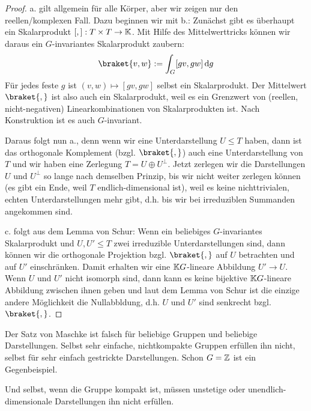 \begin{proof}
a. gilt allgemein für alle Körper, aber wir zeigen nur den reellen/komplexen Fall. Dazu beginnen wir mit b.: Zunächst gibt es überhaupt ein Skalarprodukt $[,]: T\times T\to\mathbb{K}$. Mit Hilfe des Mittelwerttricks können wir daraus ein $G$-invariantes Skalarprodukt zaubern:
\[\braket{v,w} := \int_G [gv,gw] \dd g\]
Für jedes feste $g$ ist $(v,w) \mapsto [gv,gw]$ selbst ein Skalarprodukt. Der Mittelwert $\braket{,}$ ist also auch ein Skalarprodukt, weil es ein Grenzwert von (reellen, nicht-negativen) Linearkombinationen von Skalarprodukten ist. Nach Konstruktion ist es auch $G$-invariant.

\smallbreak
Daraus folgt nun a., denn wenn wir eine Unterdarstellung $U\leq T$ haben, dann ist das orthogonale Komplement (bzgl. $\braket{,}$) auch eine Unterdarstellung von $T$ und wir haben eine Zerlegung $T=U\oplus U^\perp$. Jetzt zerlegen wir die Darstellungen $U$ und $U^\perp$ so lange nach demselben Prinzip, bis wir nicht weiter zerlegen können (es gibt ein Ende, weil $T$ endlich-dimensional ist), weil es keine nichttrivialen, echten Unterdarstellungen mehr gibt, d.h. bis wir bei irreduziblen Summanden angekommen sind.

\smallbreak
c. folgt aus dem Lemma von Schur: Wenn ein beliebiges $G$-invariantes Skalarprodukt und $U,U'\leq T$ zwei irreduzible Unterdarstellungen sind, dann können wir die orthogonale Projektion bzgl. $\braket{,}$ auf $U$ betrachten und auf $U'$ einschränken. Damit erhalten wir eine $\mathbb{K} G$-lineare Abbildung $U'\to U$. Wenn $U$ und $U'$ nicht isomorph sind, dann kann es keine bijektive $\mathbb{K} G$-lineare Abbildung zwischen ihnen geben und laut dem Lemma von Schur ist die einzige andere Möglichkeit die Nullabbldung, d.h. $U$ und $U'$ sind senkrecht bzgl. $\braket{,}$.
\end{proof}

\begin{remark}
Der Satz von Maschke ist falsch für beliebige Gruppen und beliebige Darstellungen. Selbst sehr einfache, nichtkompakte Gruppen erfüllen ihn nicht, selbst für sehr einfach gestrickte Darstellungen. Schon $G=\mathbb{Z}$ ist ein Gegenbeispiel.

Und selbst, wenn die Gruppe kompakt ist, müssen unstetige oder unendlich-dimensionale Darstellungen ihn nicht erfüllen.
\end{remark}


